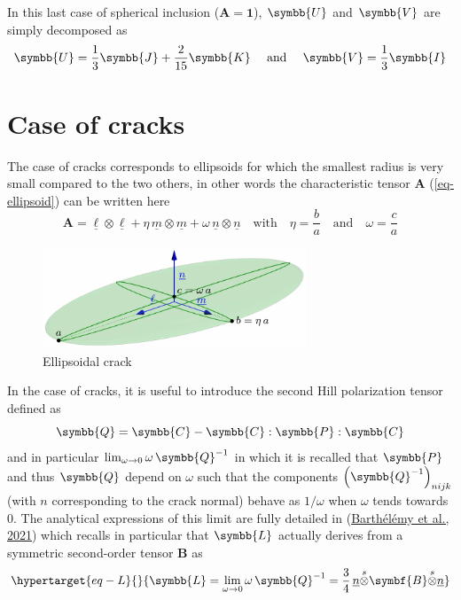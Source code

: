 \documentclass[
  letterpaper,
  DIV=11,
  numbers=noendperiod]{scrreprt}
\newcommand{\uu}[1]{{\symbf{{#1}}}}
\newcommand{\uuuu}[1]{{\symbb{{#1}}}}
\newcommand{\uv}[1]{{\underline{{#1}}}}
\newcommand{\sotimes}{{\stackrel{s}{\otimes}}}
\begin{document}
In this last case of spherical inclusion (\(\uu{A}=\uu{1}\)),
\(\uuuu{U}\) and \(\uuuu{V}\) are simply decomposed as \[
\uuuu{U}=\frac{1}{3}\uuuu{J}+\frac{2}{15}\uuuu{K}
\quad\textrm{ and }\quad
\uuuu{V}=\frac{1}{3}\uuuu{I}
\]

\hypertarget{case-of-cracks}{%
\section{Case of cracks}\label{case-of-cracks}}

The case of cracks corresponds to ellipsoids for which the smallest
radius is very small compared to the two others, in other words the
characteristic tensor \(\uu{A}\) (\ref{eq-ellipsoid}) can be written
here \[
\uu{A}=
\uv{\ell}\otimes\uv{\ell}+
\eta\,\uv{m}\otimes\uv{m}+
\omega\,\uv{n}\otimes\uv{n}
\quad\textrm{with}\quad
\eta=\frac{b}{a}
\quad\textrm{and}\quad
\omega=\frac{c}{a}
\]

\begin{figure}

{\centering 

\includegraphics[width=0.7\textwidth,height=\textheight]{appendices/../images/crack.pdf}

}

\caption{\label{fig-crack}Ellipsoidal crack}

\end{figure}

In the case of cracks, it is useful to introduce the second Hill
polarization tensor defined as \[
\uuuu{Q}=\uuuu{C}-\uuuu{C}:\uuuu{P}:\uuuu{C}
\] and in particular \(\lim_{\omega\to 0}\omega\,\uuuu{Q}^{-1}\) in
which it is recalled that \(\uuuu{P}\) and thus \(\uuuu{Q}\) depend on
\(\omega\) such that the components
\(\left(\uuuu{Q}^{-1}\right)_{nijk}\) (with \(n\) corresponding to the
crack normal) behave as \(1/\omega\) when \(\omega\) tends towards
\(0\). The analytical expressions of this limit are fully detailed in
(\protect\hyperlink{ref-barthelemyIJES2021}{Barthélémy et al., 2021})
which recalls in particular that \(\uuuu{L}\) actually derives from a
symmetric second-order tensor \(\uu{B}\) as
\begin{equation}\protect\hypertarget{eq-L}{}{
\uuuu{L}=
\lim_{\omega\to 0} \omega\,\uuuu{Q}^{-1}
=\frac{3}{4}\,\uv{n}\sotimes\uu{B}\sotimes\uv{n}
}\label{eq-L}\end{equation}
\end{document}
